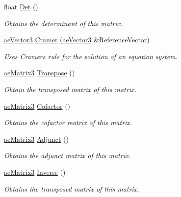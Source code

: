 \begin{DoxyCompactItemize}
\item 
float \hyperlink{structae_core_1_1ae_matrix3_ae4c2757efb47769dbeb24e65db2ceea4}{Det} ()
\begin{DoxyCompactList}\small\item\em Obtains the determinant of this matrix. \end{DoxyCompactList}\item 
\hyperlink{structae_core_1_1ae_vector3}{ae\+Vector3} \hyperlink{structae_core_1_1ae_matrix3_ae2c041d8f63ffe9790c8ffe7fa07a39a}{Cramer} (\hyperlink{structae_core_1_1ae_vector3}{ae\+Vector3} \&Reference\+Vector)
\begin{DoxyCompactList}\small\item\em Uses Cramer\textquotesingle{}s rule for the solution of an equation system. \end{DoxyCompactList}\item 
\hyperlink{structae_core_1_1ae_matrix3}{ae\+Matrix3} \hyperlink{structae_core_1_1ae_matrix3_a05be8551f23506aa3eb5856e9a84b0dd}{Transpose} ()
\begin{DoxyCompactList}\small\item\em Obtain the transposed matrix of this matrix. \end{DoxyCompactList}\item 
\hyperlink{structae_core_1_1ae_matrix3}{ae\+Matrix3} \hyperlink{structae_core_1_1ae_matrix3_aff995dc5d1f6fea6c9fb79901e552806}{Cofactor} ()
\begin{DoxyCompactList}\small\item\em Obtains the cofactor matrix of this matrix. \end{DoxyCompactList}\item 
\hyperlink{structae_core_1_1ae_matrix3}{ae\+Matrix3} \hyperlink{structae_core_1_1ae_matrix3_a5a5977b809c70665b8ae74ec2478b0ab}{Adjunct} ()
\begin{DoxyCompactList}\small\item\em Obtains the adjunct matrix of this matrix. \end{DoxyCompactList}\item 
\hyperlink{structae_core_1_1ae_matrix3}{ae\+Matrix3} \hyperlink{structae_core_1_1ae_matrix3_a3cd375176637d7da7262a7627eac1cdd}{Inverse} ()
\begin{DoxyCompactList}\small\item\em Obtains the transposed matrix of this matrix. \end{DoxyCompactList}\end{DoxyCompactItemize}
